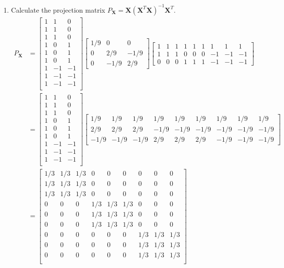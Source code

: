\documentclass{article}
\begin{document}
\begin{enumerate}[leftmargin = 0 em, label = \arabic*., font = \bfseries]
\begin{enumerate}
		\item  Calculate the projection matrix $P_{\bm X} = \bm X (\bm X^T \bm X)^{-1} \bm X^T$.
		\begin{align*}
		P_{\bm X} &= 
		\begin{bmatrix}
			1&1&0\\
			1&1&0\\
			1&1&0\\
			1&0&1\\
			1&0&1\\
			1&0&1\\
			1&-1&-1\\
			1&-1&-1\\
			1&-1&-1\\
		\end{bmatrix}
		\begin{bmatrix}
			1/9 & 0 & 0\\
			0 & 2/9 & -1/9\\
			0 & -1/9 & 2/9
		\end{bmatrix}
		\begin{bmatrix}
			1&1&1&1&1&1&1&1&1\\
			1&1&1&0&0&0&-1&-1&-1\\
			0&0&0&1&1&1&-1&-1&-1
		\end{bmatrix} 
		\\
		& = \begin{bmatrix}
			1&1&0\\
			1&1&0\\
			1&1&0\\
			1&0&1\\
			1&0&1\\
			1&0&1\\
			1&-1&-1\\
			1&-1&-1\\
			1&-1&-1\\
		\end{bmatrix}
		\begin{bmatrix}
			1/9 &1/9 &1/9&1/9&1/9&1/9&1/9&1/9&1/9\\
			2/9 &2/9 &2/9&-1/9&-1/9&-1/9&-1/9&-1/9&-1/9\\
			-1/9 & -1/9 & -1/9 & 2/9 & 2/9 & 2/9 &-1/9 &-1/9 &-1/9
		\end{bmatrix}
		\\
		&=\begin{bmatrix}
			1/3 &1/3 &1/3&0&0&0&0&0&0\\
			1/3 &1/3 &1/3&0&0&0&0&0&0\\
			1/3 &1/3 &1/3&0&0&0&0&0&0\\
			0&0&0&1/3 &1/3 &1/3 &0&0&0\\
			0&0&0&1/3 &1/3 &1/3 &0&0&0\\
			0&0&0&1/3 &1/3 &1/3 &0&0&0\\
			0&0&0&0&0&0&1/3 &1/3 &1/3\\
			0&0&0&0&0&0&1/3 &1/3 &1/3\\
			0&0&0&0&0&0&1/3 &1/3 &1/3\\
		\end{bmatrix}
		\end{align*}
	\end{enumerate}
	

\end{enumerate}
\end{document}
